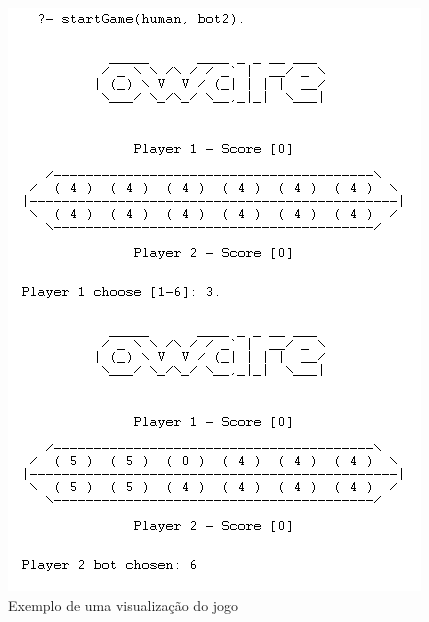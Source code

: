 \documentclass[15pt,a4paper]{article}
\begin{document}
\begin{figure}[h!]
	\begin{center}
	\includegraphics[scale=0.8]{owareExample.png}
	\caption{Exemplo de uma visualização do jogo}
	\label{fig:Comeco}
	\end{center}
\end{figure}


\newpage
\end{document}
